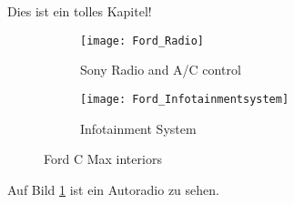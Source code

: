 \documentclass[../Bachelor_Thesis.tex]{subfiles}
\begin{document}
Dies ist ein tolles Kapitel!

\begin{figure}[h]
	\begin{subfigure}{0.5\textwidth}
		\texttt{[image: Ford\_Radio]}
		\caption{Sony Radio and A/C control \cite{Image:Infotainment_Ford_C_Max}}
		\label{fig:Ford_Radio}
	\end{subfigure}
	\begin{subfigure}{0.5\textwidth}
		\texttt{[image: Ford\_Infotainmentsystem]}
		\caption{Infotainment System \cite{Image:Infotainment_Ford_C_Max}}
		\label{fig:Ford_Infotainmentsystem}
	\end{subfigure}
	\caption{Ford C Max interiors}
\end{figure}


Auf Bild \ref{fig:Ford_Radio} ist ein Autoradio zu sehen.
\cite{Lorensen_Marching_cubes:_A_high_resolut_1987}
\end{document}

